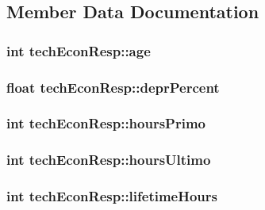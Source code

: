 \subsection{Member Data Documentation}
\hypertarget{structtech_econ_resp_a74f93b4f5d2bf3eb92da5847060f6ca4}{
\subsubsection[{age}]{\setlength{\rightskip}{0pt plus 5cm}int {\bf techEconResp::age}}}
\label{structtech_econ_resp_a74f93b4f5d2bf3eb92da5847060f6ca4}
\hypertarget{structtech_econ_resp_a3e0a92b4a702467a889a80920a7836af}{
\subsubsection[{deprPercent}]{\setlength{\rightskip}{0pt plus 5cm}float {\bf techEconResp::deprPercent}}}
\label{structtech_econ_resp_a3e0a92b4a702467a889a80920a7836af}
\hypertarget{structtech_econ_resp_aed5ec073c7496e778b6feefdaa5210b7}{
\subsubsection[{hoursPrimo}]{\setlength{\rightskip}{0pt plus 5cm}int {\bf techEconResp::hoursPrimo}}}
\label{structtech_econ_resp_aed5ec073c7496e778b6feefdaa5210b7}
\hypertarget{structtech_econ_resp_a92d29889410e20e9c574f4fc6edf736a}{
\subsubsection[{hoursUltimo}]{\setlength{\rightskip}{0pt plus 5cm}int {\bf techEconResp::hoursUltimo}}}
\label{structtech_econ_resp_a92d29889410e20e9c574f4fc6edf736a}
\hypertarget{structtech_econ_resp_a54103fb74eb1e2cc2371121e593bbda8}{
\subsubsection[{lifetimeHours}]{\setlength{\rightskip}{0pt plus 5cm}int {\bf techEconResp::lifetimeHours}}}
